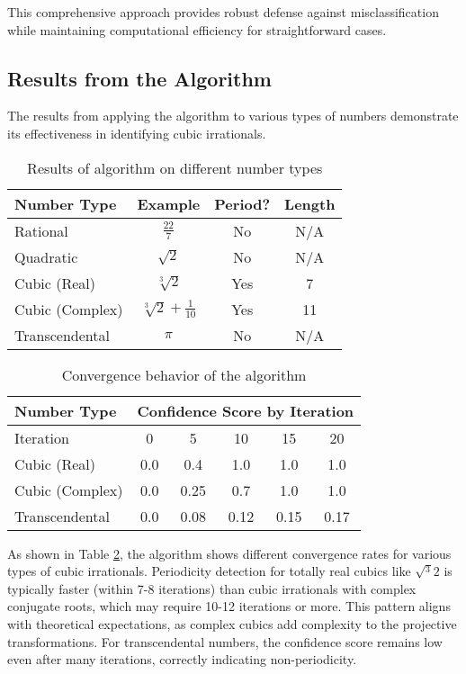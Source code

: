 This comprehensive approach provides robust defense against misclassification while maintaining computational efficiency for straightforward cases.

\subsection{Results from the \HAPD{} Algorithm}

The results from applying the \HAPD{} algorithm to various types of numbers demonstrate its effectiveness in identifying cubic irrationals.

\begin{table}[htbp]
\centering
\small
\begin{tabular}{|l|c|c|c|}
\hline
\textbf{Number Type} & \textbf{Example} & \textbf{Period?} & \textbf{Length} \\
\hline
Rational & $\frac{22}{7}$ & No & N/A \\
\hline
Quadratic & $\sqrt{2}$ & No & N/A \\
\hline
Cubic (Real) & $\sqrt[3]{2}$ & Yes & 7 \\
\hline
Cubic (Complex) & $\sqrt[3]{2} + \frac{1}{10}$ & Yes & 11 \\
\hline
Transcendental & $\pi$ & No & N/A \\
\hline
\end{tabular}
\caption{Results of \HAPD{} algorithm on different number types}
\label{tab:hapd_results}
\end{table}

\begin{table}[htbp]
\centering
\small
\begin{tabular}{|l|c|c|c|c|c|}
\hline
\textbf{Number Type} & \multicolumn{5}{c|}{\textbf{Confidence Score by Iteration}} \\
\hline
Iteration & 0 & 5 & 10 & 15 & 20 \\
\hline
Cubic (Real) & 0.0 & 0.4 & 1.0 & 1.0 & 1.0 \\
\hline
Cubic (Complex) & 0.0 & 0.25 & 0.7 & 1.0 & 1.0 \\
\hline
Transcendental & 0.0 & 0.08 & 0.12 & 0.15 & 0.17 \\
\hline
\end{tabular}
\caption{Convergence behavior of the \HAPD{} algorithm}
\label{fig:algorithmic_convergence}
\end{table}

As shown in Table \ref{fig:algorithmic_convergence}, the \HAPD{} algorithm shows different convergence rates for various types of cubic irrationals. Periodicity detection for totally real cubics like $\sqrt{^3}{2}$ is typically faster (within 7-8 iterations) than cubic irrationals with complex conjugate roots, which may require 10-12 iterations or more. This pattern aligns with theoretical expectations, as complex cubics add complexity to the projective transformations. For transcendental numbers, the confidence score remains low even after many iterations, correctly indicating non-periodicity.

